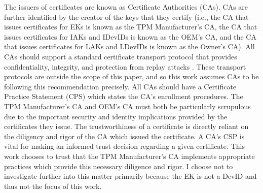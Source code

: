 The issuers of  certificates are known as Certificate Authorities (CAs). CAs are further identified by the creator of the keys that they certify (i.e., the CA that issues certificates for EKs is known as the TPM Manufacturer's CA, the CA that issues certificates for IAKs and IDevIDs is known as the OEM's CA, and the CA that issues certificates for LAKs and LDevIDs is known as the Owner's CA). All CAs should support a standard certificate transport protocol that provides confidentiality, integrity, and protection from replay attacks \cite{DevIDSpec-TCG}. These transport protocols are outside the scope of this paper, and so this work assumes CAs to be following this recommendation precisely. All CAs should have a Certificate Practice Statement (CPS) which states the CA's enrollment procedures.  The TPM Manufacturer's CA and OEM's CA must both be particularly scrupulous due to the important security and identity implications provided by the certificates they issue. The trustworthiness of a certificate is directly reliant on the diligency and rigor of the CA which issued the certificate. A CA's CSP is vital for making an informed trust decision regarding a given certificate.
This work chooses to trust that the TPM Manufacturer's CA implements appropriate practices which provide this necessary diligence and rigor. I choose not to investigate further into this matter primarily because the EK is not a DevID and thus not the focus of this work.  


%
%




